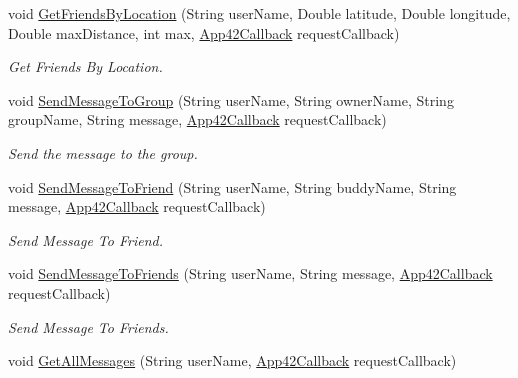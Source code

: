\begin{DoxyCompactItemize}
void \hyperlink{classcom_1_1shephertz_1_1app42_1_1paas_1_1sdk_1_1windows_1_1buddy_1_1_buddy_service_a9cdef427dd95c02bc0377cf853f826e4}{Get\+Friends\+By\+Location} (String user\+Name, Double latitude, Double longitude, Double max\+Distance, int max, \hyperlink{interfacecom_1_1shephertz_1_1app42_1_1paas_1_1sdk_1_1windows_1_1_app42_callback}{App42\+Callback} request\+Callback)
\begin{DoxyCompactList}\small\item\em Get Friends By Location. \end{DoxyCompactList}\item 
void \hyperlink{classcom_1_1shephertz_1_1app42_1_1paas_1_1sdk_1_1windows_1_1buddy_1_1_buddy_service_a5e3eef46ad4923ee85bae31c89327d9e}{Send\+Message\+To\+Group} (String user\+Name, String owner\+Name, String group\+Name, String message, \hyperlink{interfacecom_1_1shephertz_1_1app42_1_1paas_1_1sdk_1_1windows_1_1_app42_callback}{App42\+Callback} request\+Callback)
\begin{DoxyCompactList}\small\item\em Send the message to the group. \end{DoxyCompactList}\item 
void \hyperlink{classcom_1_1shephertz_1_1app42_1_1paas_1_1sdk_1_1windows_1_1buddy_1_1_buddy_service_a583061522d98354d77ce0644d5a0caa9}{Send\+Message\+To\+Friend} (String user\+Name, String buddy\+Name, String message, \hyperlink{interfacecom_1_1shephertz_1_1app42_1_1paas_1_1sdk_1_1windows_1_1_app42_callback}{App42\+Callback} request\+Callback)
\begin{DoxyCompactList}\small\item\em Send Message To Friend. \end{DoxyCompactList}\item 
void \hyperlink{classcom_1_1shephertz_1_1app42_1_1paas_1_1sdk_1_1windows_1_1buddy_1_1_buddy_service_ade35b9f423940738c817c15d8e252093}{Send\+Message\+To\+Friends} (String user\+Name, String message, \hyperlink{interfacecom_1_1shephertz_1_1app42_1_1paas_1_1sdk_1_1windows_1_1_app42_callback}{App42\+Callback} request\+Callback)
\begin{DoxyCompactList}\small\item\em Send Message To Friends. \end{DoxyCompactList}\item 
void \hyperlink{classcom_1_1shephertz_1_1app42_1_1paas_1_1sdk_1_1windows_1_1buddy_1_1_buddy_service_a3ce89e67a8a4e0855fc66242f548854b}{Get\+All\+Messages} (String user\+Name, \hyperlink{interfacecom_1_1shephertz_1_1app42_1_1paas_1_1sdk_1_1windows_1_1_app42_callback}{App42\+Callback} request\+Callback)

\end{DoxyCompactItemize}
